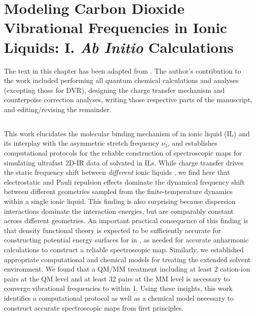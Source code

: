 \documentclass[%
  class = book,%
  crop = false,%
  float = true,%
  multi = true,%
  preview = false,%
]{standalone}
\begin{document}
\chapter[\texorpdfstring{\ce{CO2}}{CO2}-IL Cluster Model Validation]{Modeling Carbon Dioxide Vibrational Frequencies in Ionic Liquids: I. \textit{Ab Initio} Calculations}
\label{ch:paper_02}

The text in this chapter has been adapted from . The author's contribution to the work included performing all quantum chemical calculations and analyses (excepting those for DVR), designing the charge transfer mechanism and counterpoise correction analyses, writing those respective parts of the manuscript, and editing/revising the remainder.

\section{\texorpdfstring{}{Summary}}
\label{paper_02:sec:summary}

This work elucidates the molecular binding mechanism of  in \ce{[C4C1im][PF6]} ionic liquid (IL) and its interplay with the  asymmetric stretch frequency \(\nu_{3}\), and establishes computational protocols for the reliable construction of spectroscopic maps for simulating ultrafast 2D-IR data of  solvated in ILs. While charge transfer drives the static frequency shift between \emph{different} ionic liquids \parencite{Brinzer2015}, we find here that electrostatic and Pauli repulsion effects dominate the dynamical frequency shift between different geometries sampled from the finite-temperature dynamics within a single ionic liquid. This finding is also surprising because dispersion interactions dominate the \cotil{} interaction energies, but are comparably constant across different geometries. An important practical consequence of this finding is that density functional theory is expected to be sufficiently accurate for constructing potential energy surfaces for  in \ce{[C4C1im][PF6]}, as needed for accurate anharmonic calculations to construct a reliable spectroscopic map. Similarly, we established appropriate computational and chemical models for treating the extended solvent environment. We found that a QM/MM treatment including at least \num{2} cation-ion pairs at the QM level and at least \num{32} pairs at the MM level is necessary to converge vibrational frequencies to within \SI{1}{\wavenumber}. Using these insights, this work identifies a computational protocol as well as a chemical model necessary to construct accurate spectroscopic maps from first principles.
\end{document}
